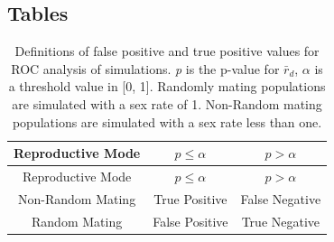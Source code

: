 \documentclass[]{article}
\theoremstyle{definition}
\theoremstyle{definition}
\theoremstyle{remark}
\begin{document}
\subsection{Tables}\label{tables}

\begin{longtable}[]{@{}ccc@{}}
\caption{\label{tab:simtab1} Definitions of false positive and true positive
values for ROC analysis of simulations. \emph{p} is the p-value for
\(\bar{r}_d\), \(\alpha\) is a threshold value in {[}0, 1{]}. Randomly
mating populations are simulated with a sex rate of 1. Non-Random mating
populations are simulated with a sex rate less than one.}\tabularnewline
\toprule
Reproductive Mode & \(p \leq \alpha\) & \(p > \alpha\)\tabularnewline
\midrule
\endfirsthead
\toprule
Reproductive Mode & \(p \leq \alpha\) & \(p > \alpha\)\tabularnewline
\midrule
\endhead
Non-Random Mating & True Positive & False Negative\tabularnewline
Random Mating & False Positive & True Negative\tabularnewline
\bottomrule
\end{longtable}
\end{document}
